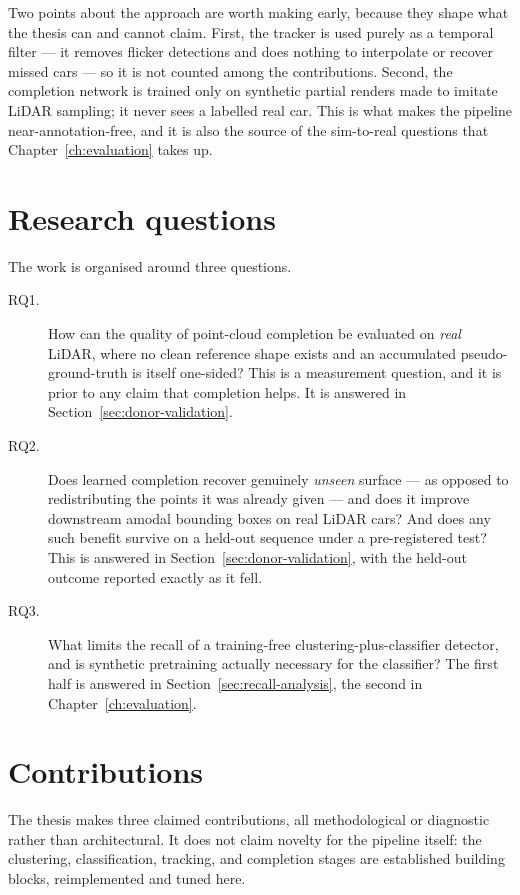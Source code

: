 Two points about the approach are worth making early, because they shape what the
thesis can and cannot claim. First, the tracker is used purely as a temporal filter
--- it removes flicker detections and does nothing to interpolate or recover missed
cars --- so it is not counted among the contributions. Second, the completion
network is trained only on synthetic partial renders made to imitate LiDAR
sampling; it never sees a labelled real car. This is what makes the pipeline
near-annotation-free, and it is also the source of the sim-to-real questions that
Chapter~\ref{ch:evaluation} takes up.

\section{Research questions}
\label{sec:intro-rq}

The work is organised around three questions.

\begin{description}
  \item[RQ1.] How can the quality of point-cloud completion be evaluated on
    \emph{real} LiDAR, where no clean reference shape exists and an accumulated
    pseudo-ground-truth is itself one-sided? This is a measurement question, and it
    is prior to any claim that completion helps. It is answered in Section~\ref{sec:donor-validation}.
  \item[RQ2.] Does learned completion recover genuinely \emph{unseen} surface --- as
    opposed to redistributing the points it was already given --- and does it
    improve downstream amodal bounding boxes on real LiDAR cars? And does any such
    benefit survive on a held-out sequence under a pre-registered test? This is
    answered in Section~\ref{sec:donor-validation}, with the held-out outcome reported exactly as it fell.
  \item[RQ3.] What limits the recall of a training-free clustering-plus-classifier
    detector, and is synthetic pretraining actually necessary for the classifier?
    The first half is answered in Section~\ref{sec:recall-analysis}, the second in Chapter~\ref{ch:evaluation}.
\end{description}

\section{Contributions}
\label{sec:intro-contributions}

The thesis makes three claimed contributions, all methodological or diagnostic
rather than architectural. It does not claim novelty for the pipeline itself: the
clustering, classification, tracking, and completion stages are established building
blocks, reimplemented and tuned here.

